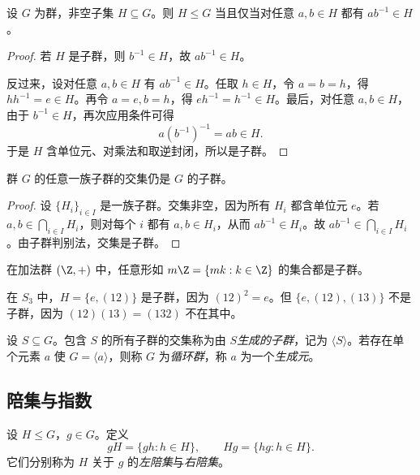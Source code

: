 \begin{theorem}[子群判别法]
设 $G$ 为群，非空子集 $H\subseteq G$。则 $H\le G$ 当且仅当对任意 $a,b\in H$ 都有 $ab^{-1}\in H$。
\end{theorem}

\begin{proof}
若 $H$ 是子群，则 $b^{-1}\in H$，故 $ab^{-1}\in H$。

反过来，设对任意 $a,b\in H$ 有 $ab^{-1}\in H$。任取 $h\in H$，令 $a=b=h$，得 $hh^{-1}=e\in H$。再令 $a=e,b=h$，得 $eh^{-1}=h^{-1}\in H$。最后，对任意 $a,b\in H$，由于 $b^{-1}\in H$，再次应用条件可得
\[
 a(b^{-1})^{-1}=ab \in H.
\]
于是 $H$ 含单位元、对乘法和取逆封闭，所以是子群。
\end{proof}

\begin{corollary}
群 $G$ 的任意一族子群的交集仍是 $G$ 的子群。
\end{corollary}

\begin{proof}
设 $\{H_i\}_{i\in I}$ 是一族子群。交集非空，因为所有 $H_i$ 都含单位元 $e$。若 $a,b\in \bigcap_{i\in I}H_i$，则对每个 $i$ 都有 $a,b\in H_i$，从而 $ab^{-1}\in H_i$。故 $ab^{-1}\in \bigcap_{i\in I}H_i$。由子群判别法，交集是子群。
\end{proof}

\begin{example}
在加法群 $(\Z,+)$ 中，任意形如 $m\Z=\{mk:k\in \Z\}$ 的集合都是子群。
\end{example}

\begin{example}
在 $S_3$ 中，$H=\{e,(12)\}$ 是子群，因为 $(12)^2=e$。但 $\{e,(12),(13)\}$ 不是子群，因为 $(12)(13)=(132)$ 不在其中。
\end{example}

\begin{definition}
设 $S\subseteq G$。包含 $S$ 的所有子群的交集称为由 $S$\emph{生成的子群}，记为 $\langle S \rangle$。若存在单个元素 $a$ 使 $G=\langle a \rangle$，则称 $G$ 为\emph{循环群}，称 $a$ 为一个\emph{生成元}。
\end{definition}

\subsection*{陪集与指数}

\begin{definition}
设 $H\le G$，$g\in G$。定义
\[
 gH=\{gh:h\in H\}, \qquad Hg=\{hg:h\in H\}.
\]
它们分别称为 $H$ 关于 $g$ 的\emph{左陪集}与\emph{右陪集}。
\end{definition}

